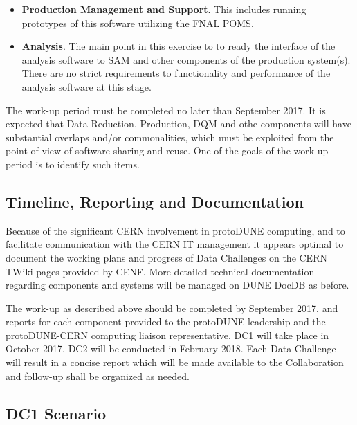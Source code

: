 \documentclass[pdftex,12pt,letter]{article}
\newcommand{\pd}{protoDUNE\xspace}
\begin{document}
\begin{itemize}
\item  \textbf{Production Management and Support}. This includes running prototypes of this software utilizing the FNAL POMS.

\item  \textbf{Analysis}. The main point in this exercise to to ready the interface of the analysis software to SAM and other
components of the production system(s). There are no strict requirements to functionality and performance of the analysis
software at this stage.

\end{itemize}
\noindent The work-up period must be completed no later than September 2017. It is expected that Data Reduction, Production, DQM
and othe components will have substantial overlaps and/or commonalities, which must be exploited from the point of view of software
sharing and reuse. One of the goals of the work-up period is to identify such items.

\subsection{Timeline, Reporting and Documentation}
Because of the significant CERN involvement in \pd computing, and to facilitate communication with the CERN IT management
it appears optimal to document the working plans and progress of Data Challenges on the CERN TWiki pages provided by
CENF. More detailed technical documentation regarding components and systems will be managed on DUNE DocDB as before.

The work-up as described above should be completed by September 2017, and reports for each component provided
to the \pd leadership and the \pd-CERN computing liaison representative. DC1 will take place in October 2017.
DC2 will be conducted in February 2018. Each Data Challenge will result in a concise report which will be made available
to the Collaboration and follow-up shall be organized as needed.

\subsection{DC1 Scenario}
\end{document}
